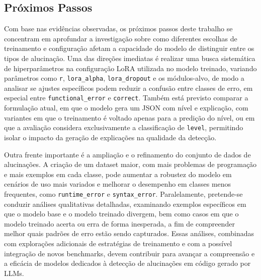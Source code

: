\documentclass[conference]{IEEEtran}
\begin{document}
\subsection{Próximos Passos}

Com base nas evidências observadas, os próximos passos deste trabalho se concentram em aprofundar a investigação sobre como diferentes escolhas de treinamento e configuração afetam a capacidade do modelo de distinguir entre os tipos de alucinação. Uma das direções imediatas é realizar uma busca sistemática de hiperparâmetros na configuração LoRA utilizada no modelo treinado, variando parâmetros como \texttt{r}, \texttt{lora\_alpha}, \texttt{lora\_dropout} e os módulos-alvo, de modo a analisar se ajustes específicos podem reduzir a confusão entre classes de erro, em especial entre \texttt{functional\_error} e \texttt{correct}. Também está previsto comparar a formulação atual, em que o modelo gera um JSON com nível e explicação, com variantes em que o treinamento é voltado apenas para a predição do nível, ou em que a avaliação considera exclusivamente a classificação de \texttt{level}, permitindo isolar o impacto da geração de explicações na qualidade da detecção.

Outra frente importante é a ampliação e o refinamento do conjunto de dados de alucinações. A criação de um dataset maior, com mais problemas de programação e mais exemplos em cada classe, pode aumentar a robustez do modelo em cenários de uso mais variados e melhorar o desempenho em classes menos frequentes, como \texttt{runtime\_error} e \texttt{syntax\_error}. Paralelamente, pretende-se conduzir análises qualitativas detalhadas, examinando exemplos específicos em que o modelo base e o modelo treinado divergem, bem como casos em que o modelo treinado acerta ou erra de forma inesperada, a fim de compreender melhor quais padrões de erro estão sendo capturados. Essas análises, combinadas com explorações adicionais de estratégias de treinamento e com a possível integração de novos benchmarks, devem contribuir para avançar a compreensão e a eficácia de modelos dedicados à detecção de alucinações em código gerado por LLMs.



\end{document}
